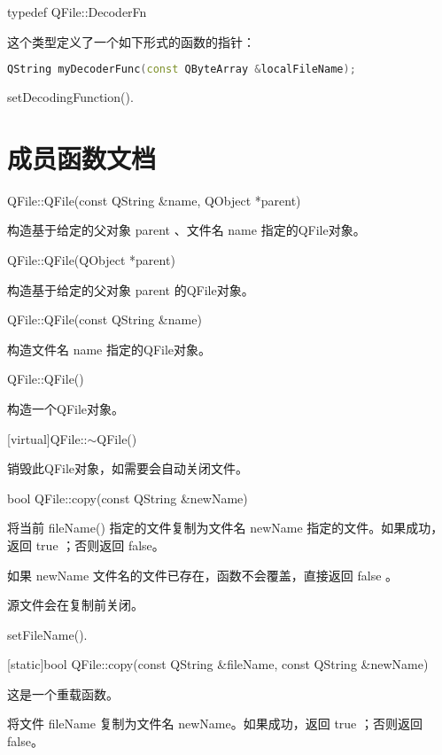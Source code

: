 typedef QFile::DecoderFn

这个类型定义了一个如下形式的函数的指针：


\begin{lstlisting}[language=C++]
QString myDecoderFunc(const QByteArray &localFileName);
\end{lstlisting}


\begin{notice}[另请参阅]
setDecodingFunction().
\end{notice} 

\splitLine

\section{成员函数文档}

QFile::QFile(const QString \&name, QObject *parent)

构造基于给定的父对象 parent 、文件名 name 指定的QFile对象。

QFile::QFile(QObject *parent)

构造基于给定的父对象 parent 的QFile对象。

QFile::QFile(const QString \&name)

构造文件名 name 指定的QFile对象。

QFile::QFile()

构造一个QFile对象。

[virtual]QFile::$\sim$QFile()

销毁此QFile对象，如需要会自动关闭文件。

bool QFile::copy(const QString \&newName)

将当前 fileName() 指定的文件复制为文件名 newName 指定的文件。如果成功，返回 true ；否则返回 false。


\begin{notice}
如果 newName 文件名的文件已存在，函数不会覆盖，直接返回 false 。
\end{notice} 



源文件会在复制前关闭。



\begin{notice}[另请参阅]
setFileName().
\end{notice} 

[static]bool QFile::copy(const QString \&fileName, const QString \&newName)

这是一个重载函数。

将文件 fileName 复制为文件名 newName。如果成功，返回 true ；否则返回 false。


